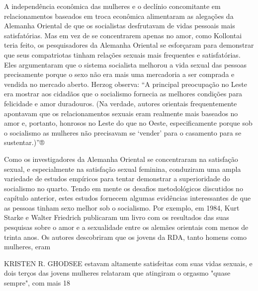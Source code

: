 A independência econômica das mulheres e o declínio concomitante em relacionamentos baseados em troca econômica alimentaram as alegações da Alemanha Oriental de que os socialistas desfrutavam de vidas pessoais mais satisfatórias. Mas em vez de se concentrarem apenas no amor, como Kollontai teria feito, os pesquisadores da Alemanha Oriental se esforçaram para demonstrar que seus compatriotas tinham relações sexuais mais frequentes e satisfatórias. Eles argumentaram que o sistema socialista melhorou a vida sexual das pessoas precisamente porque o sexo não era mais uma mercadoria a ser comprada e vendida no mercado aberto. Herzog observa: “A principal preocupação no Leste era mostrar aos cidadãos que o socialismo fornecia as melhores condições para felicidade e amor duradouros. (Na verdade, autores orientais frequentemente apontavam que os relacionamentos sexuais eram realmente mais baseados no amor e, portanto, honrosos no Leste do que no Oeste, especificamente porque sob o socialismo as mulheres não precisavam se ‘vender’ para o casamento para se sustentar.)”®
 \par 
Como os investigadores da Alemanha Oriental se concentraram na satisfação sexual, e especialmente na satisfação sexual feminina, conduziram uma ampla variedade de estudos empíricos para tentar demonstrar a superioridade do socialismo no quarto. Tendo em mente os desafios metodológicos discutidos no capítulo anterior, estes estudos fornecem algumas evidências interessantes de que as pessoas tinham sexo melhor sob o socialismo. Por exemplo, em 1984, Kurt Starke e Walter Friedrich publicaram um livro com os resultados das suas pesquisas sobre o amor e a sexualidade entre os alemães orientais com menos de trinta anos. Os autores descobriram que os jovens da RDA, tanto homens como mulheres, eram
 \par 
KRISTEN R. GHODSEE estavam altamente satisfeitas com suas vidas sexuais, e dois terços das jovens mulheres relataram que atingiram o orgasmo "quase sempre", com mais 18%
 \par 
